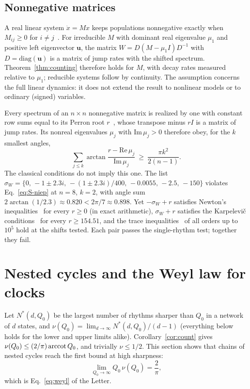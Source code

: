 \subsection{Nonnegative matrices}\label{sec:niep}

A real linear system $\dot x=Mx$ keeps populations nonnegative exactly when $M_{ij}\ge0$ for $i\ne j$~\cite{berman1994,farina2000}. For irreducible $M$ with dominant real eigenvalue $\mu_1$ and positive left eigenvector $\bm u$, the matrix $W=D(M-\mu_1I)D^{-1}$ with $D=\mathrm{diag}(\bm u)$ is a matrix of jump rates with the shifted spectrum. Theorem~\ref{thm:counting} therefore holds for $M$, with decay rates measured relative to $\mu_1$; reducible systems follow by continuity. The assumption concerns the full linear dynamics: it does not extend the result to nonlinear models or to ordinary (signed) variables.

Every spectrum of an $n\times n$ nonnegative matrix is realized by one with constant row sums equal to its Perron root $r$~\cite{johnson1981}, whose transpose minus $rI$ is a matrix of jump rates. Its nonreal eigenvalues $\mu_j$ with $\mathrm{Im}\,\mu_j>0$ therefore obey, for the $k$ smallest angles,
\begin{equation}
\sum_{j\le k}\arctan\frac{r-\mathrm{Re}\,\mu_j}{\mathrm{Im}\,\mu_j}\ \ge\ \frac{\pi k^2}{2(n-1)}.
\label{eq:S-niep}
\end{equation}
The classical conditions do not imply this one. The list $\sigma_W=\{0,\,-1\pm2.3i,\,-(1\pm2.3i)/400,\,-0.0055,\,-2.5,\,-150\}$ violates Eq.~\eqref{eq:S-niep} at $n=8$, $k=2$, with angle sum $2\arctan(1/2.3)\approx0.820<2\pi/7\approx0.898$. Yet $-\sigma_W+r$ satisfies Newton's inequalities~\cite{holtz2005} for every $r\ge0$ (in exact arithmetic), $\sigma_W+r$ satisfies the Karpelevi\v{c} conditions~\cite{dmitriev1946,karpelevich1951} for every $r\ge154.51$, and the trace inequalities~\cite{johnson1981,loewy1978} of all orders up to $10^5$ hold at the shifts tested. Each pair passes the single-rhythm test; together they fail.

\section{Nested cycles and the Weyl law for clocks}\label{sec:theta}

Let $N^*(d,Q_0)$ be the largest number of rhythms sharper than $Q_0$ in a network of $d$ states, and $\nu(Q_0)=\lim_{d\to\infty}N^*(d,Q_0)/(d-1)$ (everything below holds for the lower and upper limits alike). Corollary~\ref{cor:count} gives $\nu(Q_0)\le(2/\pi)\operatorname{arccot} Q_0$, and trivially $\nu\le1/2$. This section shows that chains of nested cycles reach the first bound at high sharpness:
\begin{equation}
\lim_{Q_0\to\infty}Q_0\,\nu(Q_0)=\frac{2}{\pi},
\label{eq:S-sharp}
\end{equation}
which is Eq.~\eqref{eq:weyl} of the Letter.

